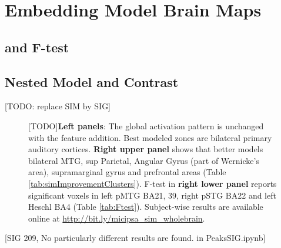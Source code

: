 \section{Embedding Model Brain Maps}
\subsection{ and  F-test}



\subsection{ Nested Model and Contrast} 
\label{subsec:sig}
[TODO: replace SIM by SIG]

\begin{figure}
    \centering
    \caption[Encoding with  Features, Group]{[TODO]\textbf{Left panels}: The global activation pattern is unchanged with the feature addition. Best modeled zones are bilateral primary auditory cortices. \textbf{Right upper panel}  shows that  better models bilateral MTG, sup Parietal, Angular Gyrus (part of Wernicke's area), supramarginal gyrus and prefrontal areas (Table \ref{tab:simImprovementClusters}). F-test in \textbf{right lower panel} reports significant voxels in left pMTG BA21, 39, right pSTG BA22 and left Heschl BA4 (Table \ref{tab:Ftest}). Subject-wise results are available online at \url{http://bit.ly/micipsa_sim_wholebrain}.} 
    \label{fig:SIG_ContrastMapG}
\end{figure}



[SIG 209, No particularly different results are found. in PeaksSIG.ipynb]


